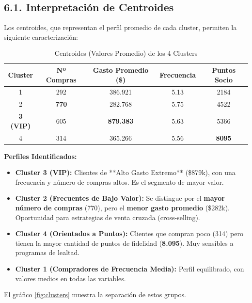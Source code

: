 \documentclass[12pt,a4paper]{article}
\begin{document}
\subsection*{6.1. Interpretación de Centroides}
Los centroides, que representan el perfil promedio de cada cluster, permiten la siguiente caracterización:

\begin{table}[H]
    \centering
    \caption{Centroides (Valores Promedio) de los 4 Clusters}
    \label{tab:centroides}
    \begin{tabular}{c c c c c}
    \toprule
    \textbf{Cluster} & \textbf{Nº Compras} & \textbf{Gasto Promedio (\$)} & \textbf{Frecuencia} & \textbf{Puntos Socio} \\
    \midrule
    1 & 292 & 386.921 & 5.13 & 2184 \\
    2 & \textbf{770} & 282.768 & 5.75 & 4522 \\
    \rowcolor{gray!20} \textbf{3 (VIP)} & 605 & \textbf{879.383} & 5.63 & 5366 \\
    4 & 314 & 365.266 & 5.56 & \textbf{8095} \\
    \bottomrule
    \end{tabular}
\end{table}

\textbf{Perfiles Identificados:}
\begin{itemize}
    \item \textbf{Cluster 3 (VIP):} Clientes de **Alto Gasto Extremo** (\$879k), con una frecuencia y número de compras altos. Es el segmento de mayor valor.
    \item \textbf{Cluster 2 (Frecuentes de Bajo Valor):} Se distingue por el \textbf{mayor número de compras} (770), pero el \textbf{menor gasto promedio} (\$282k). Oportunidad para estrategias de venta cruzada (cross-selling).
    \item \textbf{Cluster 4 (Orientados a Puntos):} Clientes que compran poco (314) pero tienen la mayor cantidad de puntos de fidelidad (\textbf{8.095}). Muy sensibles a programas de lealtad.
    \item \textbf{Cluster 1 (Compradores de Frecuencia Media):} Perfil equilibrado, con valores medios en todas las variables.
\end{itemize}

El gráfico \ref{fig:clusters} muestra la separación de estos grupos.
\end{document}
